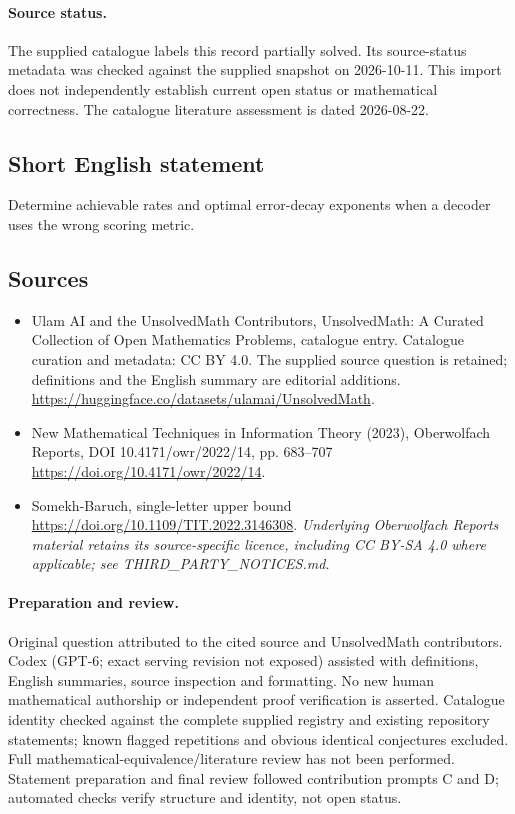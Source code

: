 \documentclass[11pt]{article}
\begin{document}
\paragraph{Source status.}
The supplied catalogue labels this record partially solved. Its source-status metadata was checked against the supplied snapshot on 2026-10-11. This import does not independently establish current open status or mathematical correctness. The catalogue literature assessment is dated 2026-08-22.
\subsection{Short English statement}
Determine achievable rates and optimal error-decay exponents when a decoder uses the wrong scoring metric.
\subsection{Sources}
\begin{itemize}
\item[S1] Ulam AI and the UnsolvedMath Contributors, UnsolvedMath: A Curated Collection of Open Mathematics Problems, catalogue entry. Catalogue curation and metadata: CC BY 4.0. The supplied source question is retained; definitions and the English summary are editorial additions.
\url{https://huggingface.co/datasets/ulamai/UnsolvedMath}.
\item[S2] New Mathematical Techniques in Information Theory (2023), Oberwolfach Reports, DOI 10.4171/owr/2022/14, pp. 683--707
\url{https://doi.org/10.4171/owr/2022/14}.
\item[S3] Somekh-Baruch, single-letter upper bound
\url{https://doi.org/10.1109/TIT.2022.3146308}.
\textit{Underlying Oberwolfach Reports material retains its source-specific licence, including CC BY-SA 4.0 where applicable; see THIRD\_PARTY\_NOTICES.md.}
\end{itemize}
\paragraph{Preparation and review.}
Original question attributed to the cited source and UnsolvedMath contributors. Codex (GPT-6; exact serving revision not exposed) assisted with definitions, English summaries, source inspection and formatting. No new human mathematical authorship or independent proof verification is asserted. Catalogue identity checked against the complete supplied registry and existing repository statements; known flagged repetitions and obvious identical conjectures excluded. Full mathematical-equivalence/literature review has not been performed. Statement preparation and final review followed contribution prompts C and D; automated checks verify structure and identity, not open status.
\label{end:statement}
\end{document}
